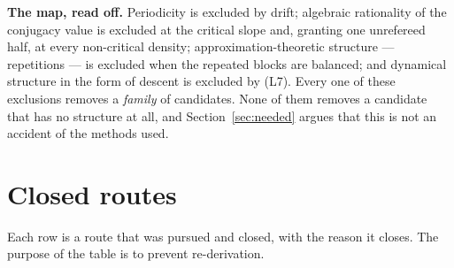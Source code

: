 \documentclass[11pt,reqno]{amsart}
\theoremstyle{plain}
\theoremstyle{definition}
\begin{document}
\medskip
\noindent\textbf{The map, read off.} Periodicity is excluded by drift; algebraic
rationality of the conjugacy value is excluded at the critical slope and, granting
one unrefereed half, at every non-critical density; approximation-theoretic
structure --- repetitions --- is excluded when the repeated blocks are balanced;
and dynamical structure in the form of descent is excluded by (L7). Every one of
these exclusions removes a \emph{family} of candidates. None of them removes a
candidate that has no structure at all, and Section~\ref{sec:needed} argues that
this is not an accident of the methods used.

\section{Closed routes}\label{sec:closed}

Each row is a route that was pursued and closed, with the reason it closes. The
purpose of the table is to prevent re-derivation.
\end{document}

